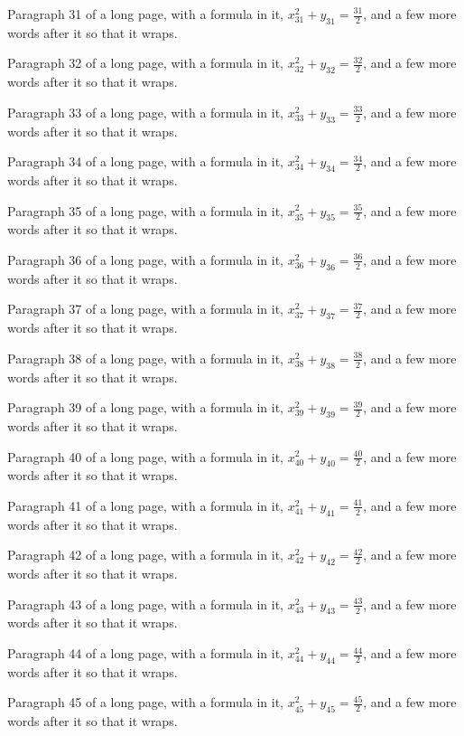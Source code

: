 Paragraph 31 of a long page, with a formula in it, $x_{31}^2 + y_{31} = \frac{31}{2}$, and a few more words after it so that it wraps.

Paragraph 32 of a long page, with a formula in it, $x_{32}^2 + y_{32} = \frac{32}{2}$, and a few more words after it so that it wraps.

Paragraph 33 of a long page, with a formula in it, $x_{33}^2 + y_{33} = \frac{33}{2}$, and a few more words after it so that it wraps.

Paragraph 34 of a long page, with a formula in it, $x_{34}^2 + y_{34} = \frac{34}{2}$, and a few more words after it so that it wraps.

Paragraph 35 of a long page, with a formula in it, $x_{35}^2 + y_{35} = \frac{35}{2}$, and a few more words after it so that it wraps.

Paragraph 36 of a long page, with a formula in it, $x_{36}^2 + y_{36} = \frac{36}{2}$, and a few more words after it so that it wraps.

Paragraph 37 of a long page, with a formula in it, $x_{37}^2 + y_{37} = \frac{37}{2}$, and a few more words after it so that it wraps.

Paragraph 38 of a long page, with a formula in it, $x_{38}^2 + y_{38} = \frac{38}{2}$, and a few more words after it so that it wraps.

Paragraph 39 of a long page, with a formula in it, $x_{39}^2 + y_{39} = \frac{39}{2}$, and a few more words after it so that it wraps.

Paragraph 40 of a long page, with a formula in it, $x_{40}^2 + y_{40} = \frac{40}{2}$, and a few more words after it so that it wraps.

Paragraph 41 of a long page, with a formula in it, $x_{41}^2 + y_{41} = \frac{41}{2}$, and a few more words after it so that it wraps.

Paragraph 42 of a long page, with a formula in it, $x_{42}^2 + y_{42} = \frac{42}{2}$, and a few more words after it so that it wraps.

Paragraph 43 of a long page, with a formula in it, $x_{43}^2 + y_{43} = \frac{43}{2}$, and a few more words after it so that it wraps.

Paragraph 44 of a long page, with a formula in it, $x_{44}^2 + y_{44} = \frac{44}{2}$, and a few more words after it so that it wraps.

Paragraph 45 of a long page, with a formula in it, $x_{45}^2 + y_{45} = \frac{45}{2}$, and a few more words after it so that it wraps.

